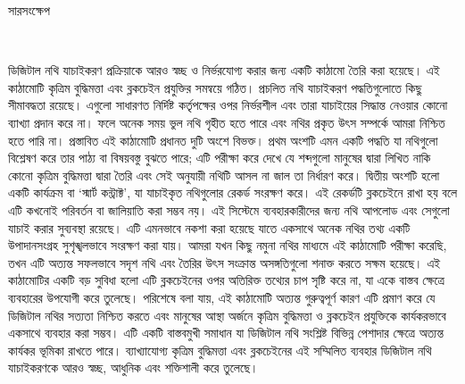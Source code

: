 % 

\doublespacing
\begin{center}
    \Large সারসংক্ষেপ\\
    \singlespacing
    {\large\thesistitle}\\
\end{center}

ডিজিটাল নথি যাচাইকরণ প্রক্রিয়াকে আরও স্বচ্ছ ও নির্ভরযোগ্য করার জন্য একটি কাঠামো তৈরি করা হয়েছে। এই কাঠামোটি কৃত্রিম বুদ্ধিমত্তা এবং ব্লকচেইন প্রযুক্তির সমন্বয়ে গঠিত। প্রচলিত নথি যাচাইকরণ পদ্ধতিগুলোতে কিছু সীমাবদ্ধতা রয়েছে। এগুলো সাধারণত নির্দিষ্ট কর্তৃপক্ষের ওপর নির্ভরশীল এবং তারা যাচাইয়ের সিদ্ধান্ত নেওয়ার কোনো ব্যাখ্যা প্রদান করে না। ফলে অনেক সময় ভুল নথি গৃহীত হতে পারে এবং নথির প্রকৃত উৎস সম্পর্কে আমরা নিশ্চিত হতে পারি না। প্রস্তাবিত এই কাঠামোটি প্রধানত দুটি অংশে বিভক্ত। প্রথম অংশটি এমন একটি পদ্ধতি যা নথিগুলো বিশ্লেষণ করে তার পাঠ্য বা বিষয়বস্তু বুঝতে পারে; এটি পরীক্ষা করে দেখে যে শব্দগুলো মানুষের দ্বারা লিখিত নাকি কোনো কৃত্রিম বুদ্ধিমত্তা দ্বারা তৈরি এবং সেই অনুযায়ী নথিটি আসল না জাল তা নির্ধারণ করে। দ্বিতীয় অংশটি হলো একটি কার্যক্রম বা ‘স্মার্ট কন্ট্রাক্ট’, যা যাচাইকৃত নথিগুলোর রেকর্ড সংরক্ষণ করে। এই রেকর্ডটি ব্লকচেইনে রাখা হয় বলে এটি কখনোই পরিবর্তন বা জালিয়াতি করা সম্ভব নয়। এই সিস্টেমে ব্যবহারকারীদের জন্য নথি আপলোড এবং সেগুলো যাচাই করার সুব্যবস্থা রয়েছে। এটি এমনভাবে নকশা করা হয়েছে যাতে একসাথে অনেক নথির তথ্য একটি উপাদানসংগ্রহ সুশৃঙ্খলভাবে সংরক্ষণ করা যায়। আমরা যখন কিছু নমুনা নথির মাধ্যমে এই কাঠামোটি পরীক্ষা করেছি, তখন এটি অত্যন্ত সফলভাবে সদৃশ নথি এবং তৈরির উৎস সংক্রান্ত অসঙ্গতিগুলো শনাক্ত করতে সক্ষম হয়েছে। এই কাঠামোটির একটি বড় সুবিধা হলো এটি ব্লকচেইনের ওপর অতিরিক্ত তথ্যের চাপ সৃষ্টি করে না, যা একে বাস্তব ক্ষেত্রে ব্যবহারের উপযোগী করে তুলেছে। পরিশেষে বলা যায়, এই কাঠামোটি অত্যন্ত গুরুত্বপূর্ণ কারণ এটি প্রমাণ করে যে ডিজিটাল নথির সত্যতা নিশ্চিত করতে এবং মানুষের আস্থা অর্জনে কৃত্রিম বুদ্ধিমত্তা ও ব্লকচেইন প্রযুক্তিকে কার্যকরভাবে একসাথে ব্যবহার করা সম্ভব। এটি একটি বাস্তবমুখী সমাধান যা ডিজিটাল নথি সংশ্লিষ্ট বিভিন্ন পেশাদার ক্ষেত্রে অত্যন্ত কার্যকর ভূমিকা রাখতে পারে। ব্যাখ্যাযোগ্য কৃত্রিম বুদ্ধিমত্তা এবং ব্লকচেইনের এই সম্মিলিত ব্যবহার ডিজিটাল নথি যাচাইকরণকে আরও স্বচ্ছ, আধুনিক এবং শক্তিশালী করে তুলেছে।
